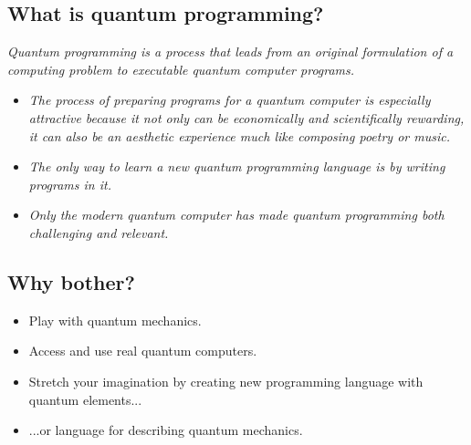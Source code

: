 \documentclass{beamer}
\begin{document}
\subsection{What is quantum programming?}
\begin{frame}{\insertsection}{\insertsubsection}
    
\emph{Quantum programming is a process that leads from an 
original formulation of a computing problem to executable quantum computer 
programs.}
\end{frame}


\begin{frame}{\insertsection}{\insertsubsection}

\begin{itemize}

    \item<1-> \emph{The process of preparing programs for a quantum computer is 
    especially attractive because it not only can be economically and 
    scientifically rewarding, it can also be an aesthetic experience much like 
    composing poetry or music.}

    \item<2-> \emph{The only way to learn a new quantum programming language is 
    by writing programs in it.}

    \item<3-> \emph{Only the modern quantum computer has made quantum 
    programming both challenging and relevant.}
\end{itemize}
\end{frame}

\subsection{Why bother?}

\begin{frame}{\insertsection}{\insertsubsection}
	\begin{itemize}
        \item<1-> Play with quantum mechanics.
        \item<2-> Access and use real quantum computers.
        \item<3-> Stretch your imagination by creating new programming 
        language with quantum elements...
        \item<4->{...or language for describing quantum mechanics.}
    \end{itemize}
	
\end{frame}
\end{document}
